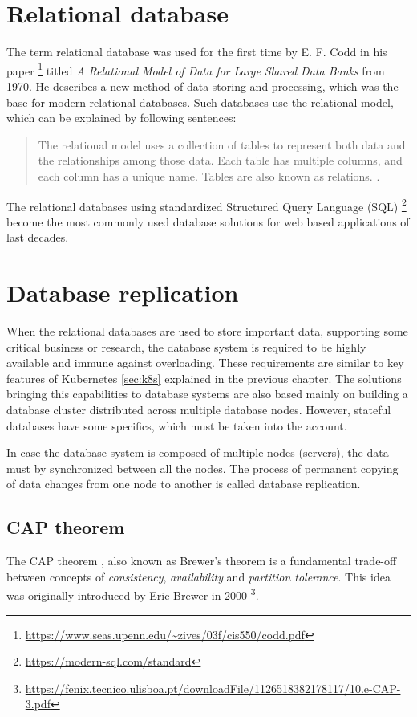 \documentclass[
  digital, %
  twoside, %
  table,   %
  lof,     %
  lot,     %
]{fithesis3}
\begin{document}
\section{Relational database}
The term relational database was used for the first time by E. F. Codd in his paper \footnote{\url{https://www.seas.upenn.edu/~zives/03f/cis550/codd.pdf}} titled \textit{A Relational Model of Data for Large Shared Data Banks} from 1970. He describes a new method of data storing and processing, which was the base for modern relational databases. Such databases use the relational model, which can be explained by following sentences:
\begin{quote}
The relational model uses a collection of tables to represent both data and the relationships among those data. Each table has multiple columns, and each column has a unique name. Tables are also known as relations. \cite{db, p. 9}.
\end{quote}

The relational databases using standardized Structured Query Language (SQL) \footnote{\url{https://modern-sql.com/standard}} become the most commonly used database solutions for web based applications of last decades.

\section{Database replication} \label{sec: db_replication}
When the relational databases are used to store important data, supporting some critical business or research, the database system is required to be highly available and immune against overloading. These requirements are similar to key features of Kubernetes \ref{sec:k8s} explained in the previous chapter. The solutions bringing this capabilities to database systems are also based mainly on building a database cluster distributed across multiple database nodes. However, stateful databases have some specifics, which must be taken into the account.

In case the database system is composed of multiple nodes (servers), the data must by synchronized between all the nodes. The process of permanent copying of data changes from one node to another is called database replication.

\subsection{CAP theorem}
The CAP theorem \cite{cap}, also known as Brewer's theorem is a fundamental trade-off between concepts of \textit{consistency}, \textit{availability} and \textit{partition tolerance}. This idea was originally introduced by Eric Brewer in 2000 \footnote{\url{https://fenix.tecnico.ulisboa.pt/downloadFile/1126518382178117/10.e-CAP-3.pdf}}.
\end{document}
